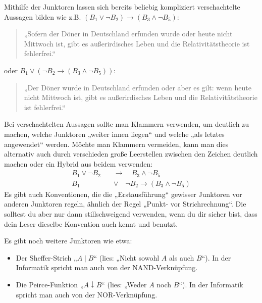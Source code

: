 	
	
	\begin{bem}
Mithilfe der Junktoren lassen sich bereits beliebig kompliziert verschachtelte Aussagen bilden wie z.B. $(B_1\lor \neg B_2) \to (B_3\land \neg B_5)$:
\begin{quote}
 „Sofern der Döner in Deutschland erfunden wurde oder heute nicht Mittwoch ist, gibt es außerirdisches Leben und die Relativitätstheorie ist fehlerfrei.“
\end{quote}
oder
$B_1\lor (\neg B_2 \to (B_3\land \neg B_5))$:
\begin{quote}
„Der Döner wurde in Deutschland erfunden oder aber es gilt: wenn heute nicht Mittwoch ist, gibt es außerirdisches Leben und die Relativitätstheorie ist fehlerfrei.“
\end{quote}
Bei verschachtelten Aussagen sollte man Klammern verwenden, um deutlich zu machen, welche Junktoren „weiter innen liegen“ und welche „als letztes angewendet“ werden. Möchte man Klammern vermeiden, kann man dies alternativ auch durch verschieden große Leerstellen zwischen den Zeichen deutlich machen oder ein Hybrid aus beidem verwenden:
\begin{align*}
 B_1\lor \neg B_2\quad &\to \quad B_3\land \neg B_5 \\[0.5em]
 B_1\quad  &\lor \quad \neg B_2 \to (B_3\land \neg B_5)
\end{align*}
Es gibt auch Konventionen, die die „Erstausführung“ gewisser Junktoren vor anderen Junktoren regeln, ähnlich der Regel „Punkt- vor Strichrechnung“. Die solltest du aber nur dann stillschweigend verwenden, wenn du dir sicher bist, dass dein Leser dieselbe Konvention auch kennt und benutzt.
\end{bem}


	
\begin{bem}
Es gibt noch weitere Junktoren wie etwa:
 \begin{itemize}
  \item Der Sheffer-Strich „$A\mid B$“ (lies: „Nicht sowohl $A$ als auch $B$“). In der Informatik spricht man auch von der NAND-Verknüpfung.
  \item Die Peirce-Funktion „$A\downarrow B$“ (lies: „Weder $A$ noch $B$“). In der Informatik spricht man auch von der NOR-Verknüpfung.
 \end{itemize}
\end{bem}

